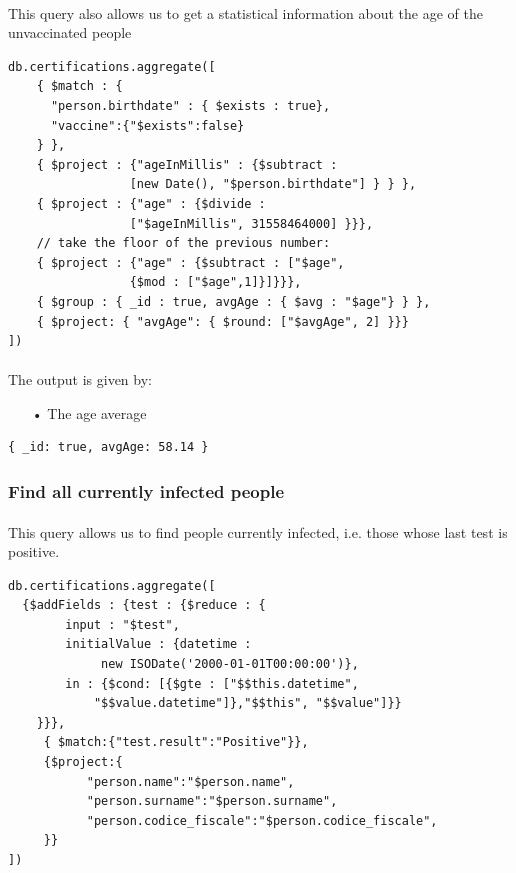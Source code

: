 \documentclass[a4paper,12pt]{article}
\begin{document}
\paragraph{} This query also allows us to get a statistical information about the age of the unvaccinated people
\begin{tcolorbox}[colback=green!5!white,colframe=green!75!black,title=QUERY]
\begin{verbatim}
db.certifications.aggregate([
    { $match : { 
      "person.birthdate" : { $exists : true},
      "vaccine":{"$exists":false}
    } },
    { $project : {"ageInMillis" : {$subtract : 
                 [new Date(), "$person.birthdate"] } } }, 
    { $project : {"age" : {$divide : 
                 ["$ageInMillis", 31558464000] }}},
    // take the floor of the previous number:
    { $project : {"age" : {$subtract : ["$age", 
                 {$mod : ["$age",1]}]}}},
    { $group : { _id : true, avgAge : { $avg : "$age"} } },
    { $project: { "avgAge": { $round: ["$avgAge", 2] }}}
])
\end{verbatim}
\end{tcolorbox}
\paragraph{} The output is given by: 
\begin{itemize}
\item[•] The age average
\end{itemize}
\begin{tcolorbox}[colback=red!5!white,colframe=red!75!black,title=OUTPUT]
\begin{verbatim}
{ _id: true, avgAge: 58.14 }
\end{verbatim}
\end{tcolorbox}

\subsubsection{Find all currently infected people}
\paragraph{} This query allows us to find people currently infected, i.e. those whose last test is positive.
\begin{tcolorbox}[colback=green!5!white,colframe=green!75!black,title=QUERY]
\begin{verbatim}
db.certifications.aggregate([
  {$addFields : {test : {$reduce : {
        input : "$test", 
        initialValue : {datetime : 
             new ISODate('2000-01-01T00:00:00')}, 
        in : {$cond: [{$gte : ["$$this.datetime", 
            "$$value.datetime"]},"$$this", "$$value"]}}
    }}},
     { $match:{"test.result":"Positive"}},
     {$project:{
           "person.name":"$person.name",
           "person.surname":"$person.surname",
           "person.codice_fiscale":"$person.codice_fiscale",
     }}
])
\end{verbatim}
\end{tcolorbox}
\end{document}

